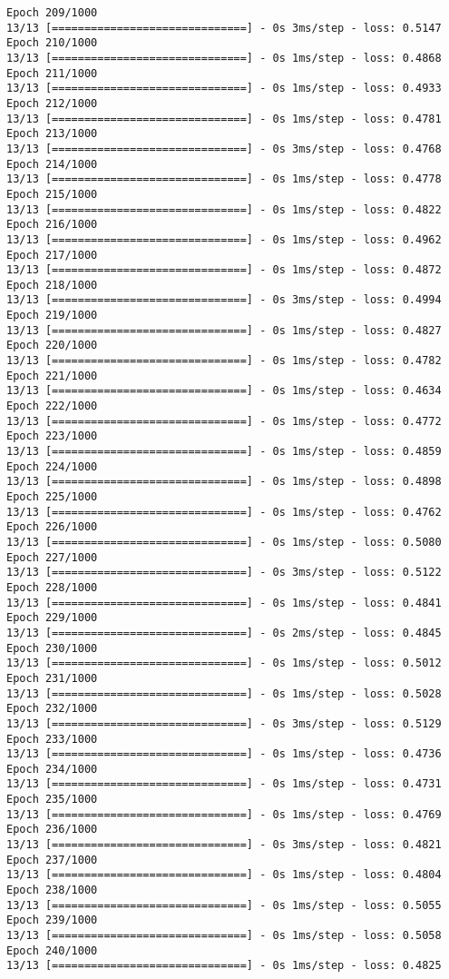 \documentclass[11pt]{article}
\begin{document}
\begin{Verbatim}[commandchars=\\\{\}]
Epoch 209/1000
13/13 [==============================] - 0s 3ms/step - loss: 0.5147
Epoch 210/1000
13/13 [==============================] - 0s 1ms/step - loss: 0.4868
Epoch 211/1000
13/13 [==============================] - 0s 1ms/step - loss: 0.4933
Epoch 212/1000
13/13 [==============================] - 0s 1ms/step - loss: 0.4781
Epoch 213/1000
13/13 [==============================] - 0s 3ms/step - loss: 0.4768
Epoch 214/1000
13/13 [==============================] - 0s 1ms/step - loss: 0.4778
Epoch 215/1000
13/13 [==============================] - 0s 1ms/step - loss: 0.4822
Epoch 216/1000
13/13 [==============================] - 0s 1ms/step - loss: 0.4962
Epoch 217/1000
13/13 [==============================] - 0s 1ms/step - loss: 0.4872
Epoch 218/1000
13/13 [==============================] - 0s 3ms/step - loss: 0.4994
Epoch 219/1000
13/13 [==============================] - 0s 1ms/step - loss: 0.4827
Epoch 220/1000
13/13 [==============================] - 0s 1ms/step - loss: 0.4782
Epoch 221/1000
13/13 [==============================] - 0s 1ms/step - loss: 0.4634
Epoch 222/1000
13/13 [==============================] - 0s 1ms/step - loss: 0.4772
Epoch 223/1000
13/13 [==============================] - 0s 1ms/step - loss: 0.4859
Epoch 224/1000
13/13 [==============================] - 0s 1ms/step - loss: 0.4898
Epoch 225/1000
13/13 [==============================] - 0s 1ms/step - loss: 0.4762
Epoch 226/1000
13/13 [==============================] - 0s 1ms/step - loss: 0.5080
Epoch 227/1000
13/13 [==============================] - 0s 3ms/step - loss: 0.5122
Epoch 228/1000
13/13 [==============================] - 0s 1ms/step - loss: 0.4841
Epoch 229/1000
13/13 [==============================] - 0s 2ms/step - loss: 0.4845
Epoch 230/1000
13/13 [==============================] - 0s 1ms/step - loss: 0.5012
Epoch 231/1000
13/13 [==============================] - 0s 1ms/step - loss: 0.5028
Epoch 232/1000
13/13 [==============================] - 0s 3ms/step - loss: 0.5129
Epoch 233/1000
13/13 [==============================] - 0s 1ms/step - loss: 0.4736
Epoch 234/1000
13/13 [==============================] - 0s 1ms/step - loss: 0.4731
Epoch 235/1000
13/13 [==============================] - 0s 1ms/step - loss: 0.4769
Epoch 236/1000
13/13 [==============================] - 0s 3ms/step - loss: 0.4821
Epoch 237/1000
13/13 [==============================] - 0s 1ms/step - loss: 0.4804
Epoch 238/1000
13/13 [==============================] - 0s 1ms/step - loss: 0.5055
Epoch 239/1000
13/13 [==============================] - 0s 1ms/step - loss: 0.5058
Epoch 240/1000
13/13 [==============================] - 0s 1ms/step - loss: 0.4825

\end{Verbatim}
\end{document}

